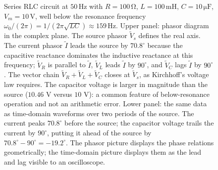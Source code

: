 \begin{figure}[p]
\vspace{1em}


\caption[Series RLC phasor diagram and time-domain
waveforms]{Series RLC circuit at $50\,\si{\hertz}$ with
$R = 100\,\si{\ohm}$, $L = 100\,\si{\milli\henry}$,
$C = 10\,\si{\micro\farad}$, $V_{m} = 10\,\si{\volt}$, well
below the resonance frequency
$\omega_{0}/(2\pi) = 1/(2\pi\sqrt{LC}) \approx 159\,\si{\hertz}$.
Upper panel: phasor diagram in the complex plane. The source
phasor $\tilde V_{s}$ defines the real axis. The current phasor
$\tilde I$ leads the source by $70.8^{\circ}$ because the
capacitive reactance dominates the inductive reactance at this
frequency; $\tilde V_{R}$ is parallel to $\tilde I$, $\tilde
V_{L}$ leads $\tilde I$ by $90^{\circ}$, and $\tilde V_{C}$ lags
$\tilde I$ by $90^{\circ}$. The vector chain
$\tilde V_{R} + \tilde V_{L} + \tilde V_{C}$ closes at $\tilde
V_{s}$, as Kirchhoff's voltage law requires. The capacitor
voltage is larger in magnitude than the source ($10.46$ V versus
$10$ V): a common feature of below-resonance operation and not an
arithmetic error. Lower panel: the same data as time-domain
waveforms over two periods of the source. The current peaks
$70.8^{\circ}$ before the source; the capacitor voltage trails
the current by $90^{\circ}$, putting it ahead of the source by
$70.8^{\circ}-90^{\circ}=-19.2^{\circ}$. The phasor picture
displays the phase relations geometrically; the time-domain
picture displays them as the lead and lag visible to an
oscilloscope.}
\label{fig:vol02:ch03:phasor-rlc}
\end{figure}
